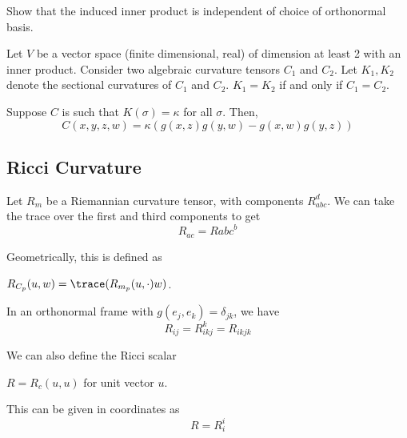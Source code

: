 \documentclass[../main.tex]{subfiles}
\begin{document}
\begin{hw}
    Show that the induced inner product is independent of choice of orthonormal
    basis.
\end{hw}

\begin{lemma}
    Let $V$ be a vector space (finite dimensional, real) of dimension at least
    2 with an inner product. Consider two algebraic curvature tensors $C_1$ and
    $C_2$. Let $K_1,K_2$ denote the sectional curvatures of $C_1$ and $C_2$.
    $K_1 = K_2$ if and only if $C_1 = C_2$.
\end{lemma}

Suppose $C$ is such that $K(\sigma)=\kappa$ for all $\sigma$. Then,
\begin{equation}
    C(x,y,z,w) = \kappa\left( g(x,z)g(y,w) -g(x,w)g(y,z) \right)
\end{equation}

\subsection*{Ricci Curvature}
Let $R_m$ be a Riemannian curvature tensor, with components $R_{abc}^d$.
We can take the trace over the first and third components to get
\begin{equation}
    R_{ac} = R{abc}^b
\end{equation}

Geometrically, this is defined as
\begin{defn}
    $R_{C_p}(u,w) = \trace(R_{m_p}(u,\cdot)w)$.
\end{defn}

In an orthonormal frame with $g(e_j,e_k) = \delta_{jk}$, we have
\begin{equation}
    R_{ij} = R_{ikj}^k = R_{ikjk}
\end{equation}

We can also define the Ricci scalar
\begin{defn}
    $R = R_c(u,u)$ for unit vector $u$.
\end{defn}
This can be given in coordinates as
\begin{equation}
    R = R^i_i
\end{equation}
\end{document}
